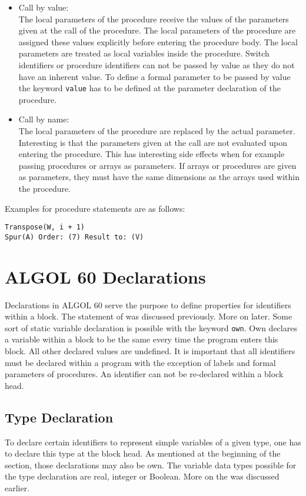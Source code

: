 \documentclass{article}
\begin{document}
\begin{itemize}
	\item Call by value:\\
	The local parameters of the procedure receive the values of the parameters given at the call of the procedure. The local parameters of the procedure are assigned these values explicitly before entering the procedure body. The local parameters are treated as local variables inside the procedure. Switch identifiers or procedure identifiers can not be passed by value as they do not have an inherent value. To define a formal parameter to be passed by value the keyword \texttt{value} has to be defined at the parameter declaration of the procedure.
	\item Call by name:\\
	The local parameters of the procedure are replaced by the actual parameter. Interesting is that the parameters given at the call are not evaluated upon entering the procedure. This has interesting side effects when for example passing procedures or arrays as parameters. If arrays or procedures are given as parameters, they must have the same dimensions as the arrays used within the procedure.
\end{itemize}

Examples for procedure statements are as follows:\\ 
\begin{lstlisting}[language={[60]algol}]
Transpose(W, i + 1)
Spur(A) Order: (7) Result to: (V)
\end{lstlisting}

\newpage

\section{ALGOL 60 Declarations}
Declarations in ALGOL 60 serve the purpose to define properties for identifiers within a block. The statement of  was discussed previously. More on  later. Some sort of static variable declaration is possible with the keyword \texttt{own}. Own declares a variable within a block to be the same every time the program enters this block. All other declared values are undefined. It is important that all identifiers must be declared within a program with the exception of labels and formal parameters of procedures. An identifier can not be re-declared within a block head. 

\subsection{Type Declaration} \label{typeDecl}
To declare certain identifiers to represent simple variables of a given type, one has to declare this type at the block head. As mentioned at the beginning of the section, those declarations may also be own. The variable data types possible for the type declaration are real, integer or Boolean. More on the  was discussed earlier.
\end{document}
